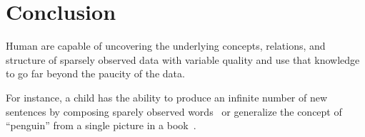 \chapter{Conclusion}

Human are capable of uncovering the underlying concepts, relations, and structure of sparsely observed data with variable quality and use that knowledge to go far beyond the paucity of the data.

For instance, a child has the ability to produce an infinite number of new sentences by composing sparely observed words~\citep{lake2017building} or generalize the concept of ``penguin'' from a single picture in a book~\citep{vinyals2016matching}. 